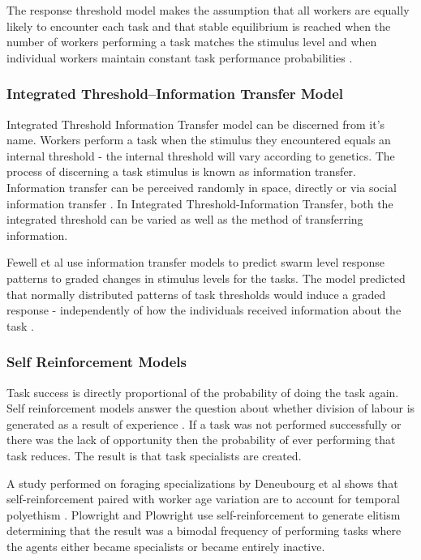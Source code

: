 The response threshold model makes the assumption that all workers are equally likely to encounter each task and that stable equilibrium is reached when the number of workers performing a task matches the stimulus level and when individual workers maintain constant task performance probabilities \cite{page1990self}.

\subsubsection{Integrated Threshold--Information Transfer Model}

Integrated Threshold Information Transfer model can be discerned from it's name. Workers perform a task when the stimulus they encountered equals an internal threshold - the internal threshold will vary according to genetics. The process of discerning a task stimulus is known as information transfer. Information transfer can be perceived randomly in space, directly or via social information transfer  \cite{fewell1999division}. In Integrated Threshold-Information Transfer, both the integrated threshold can be varied as well as the method of transferring information.

Fewell et al  use information transfer models to predict swarm level response patterns to graded changes in stimulus levels for the tasks. The model predicted that normally distributed patterns of task thresholds would induce a graded response - independently of how the individuals received information about the task \cite{fewell1999division}.


\subsubsection{Self Reinforcement Models}

Task success is directly proportional of the probability of doing the task again. Self reinforcement models answer the question about whether division of labour is generated as a result of experience \cite{lerman2005review}. If a task was not performed successfully or there was the lack of opportunity then the probability of ever performing that task reduces. The result is that task specialists are created. 

A study performed on foraging specializations by Deneubourg et al shows that self-reinforcement paired with worker age variation are to account for temporal polyethism \cite{deneubourg1987self}. Plowright and Plowright use self-reinforcement to generate elitism \cite{plowright1988elitism} determining that the result was a bimodal frequency of performing tasks where the agents either became specialists or became entirely inactive.

